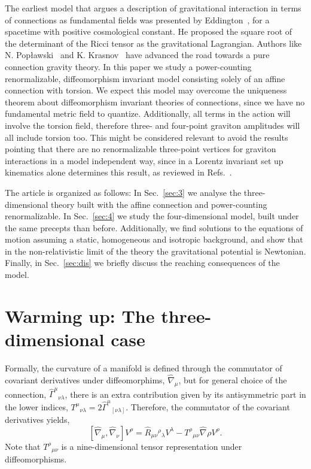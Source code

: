 \documentclass[twocolumn,aps,
  showpacs,showkeys,prd,superscriptaddress]{revtex4-1}
\newcommand{\Ga}{\Gamma}
\newcommand\hnab[1][]{\hat{\nabla}_{#1}}
\newcommand{\comm}[2]{\left[#1,#2\right]}
\renewcommand{\(}{\left(}
\renewcommand{\)}{\right)}
\renewcommand{\[}{\left[}
\renewcommand{\]}{\right]}
\begin{document}
The earliest model that argues  a description of gravitational interaction in terms of connections as fundamental fields  was presented by Eddington~\cite{Eddington1923math}, for a spacetime with positive cosmological constant. He proposed the square root of the determinant of the Ricci tensor as the gravitational Lagrangian. Authors like N. Pop{\l}awski~\cite{Poplawski:2012bw} and K. Krasnov~\cite{Krasnov:2011pp} have advanced the road towards a pure connection gravity theory. In this paper we study a power-counting renormalizable,  diffeomorphism invariant model  consisting  solely of an affine connection with torsion. We expect  this model may  overcome  the uniqueness theorem about diffeomorphism invariant theories of connections, since we  have no fundamental metric field to quantize.  Additionally, all terms in the action will involve the torsion field, therefore three- and four-point graviton amplitudes will all include torsion too. This might be considered relevant to avoid the results pointing that there are no renormalizable three-point vertices for graviton interactions in a model independent way, since in a Lorentz invariant set up kinematics alone determines this result, as reviewed in Refs.~\cite{McGady:2013sga,Camanho:2014apa}.
 
The article is organized as follows: In Sec.~\ref{sec:3} we analyse the three-dimensional theory built with the affine connection and power-counting renormalizable. In Sec.~\ref{sec:4} we study the four-dimensional model, built under the same precepts than before. Additionally, we find solutions to the equations of motion assuming a static, homogeneous and isotropic background, and show that in the non-relativistic limit of the theory the gravitational potential is Newtonian. Finally, in Sec.~\ref{sec:dis} we briefly discuss the reaching consequences of the model.



\section{\label{sec:3} Warming up: The three-dimensional case}


Formally, the curvature of a manifold is defined through the commutator of covariant derivatives under diffeomorphims, $\hat{\nabla}_\mu$, but for general choice of the connection, $\hat{\Ga}^\mu{}_{\nu\lambda}$, there is an extra contribution given by its antisymmetric part in the lower indices, $T^\mu{}_{\nu\lambda} = 2\hat{\Ga}^\mu{}_{[\nu\lambda]}$. Therefore, the commutator of the covariant derivatives yields,
\begin{equation}
  \comm{\hat{\nabla}_{\mu}}{\hat{\nabla}_{\nu}}V^\rho = \hat{R}_{\mu\nu}{}^\rho{}_\lambda V^\lambda - T^\rho{}_{\mu\nu}\hnab{\rho}V^\rho.
  \label{curvdef}
\end{equation}
Note that $T^\rho{}_{\mu\nu}$ is a nine-dimensional tensor representation under diffeomorphisms.
\end{document}
